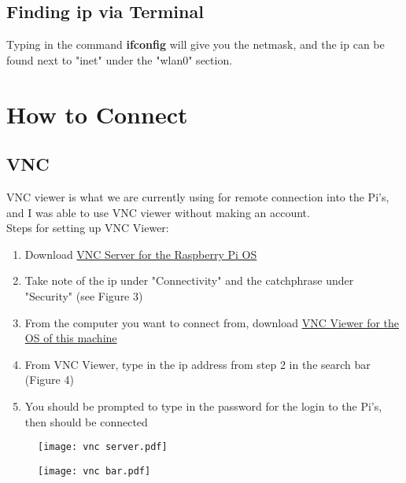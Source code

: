 \documentclass[12pt]{extarticle}
\begin{document}
\subsection{Finding ip via Terminal}
Typing in the command \textbf{ifconfig} will give you the netmask, and the ip can be found next to "inet" under the "wlan0" section.

\newpage
\section{How to Connect}
\subsection{VNC}
VNC viewer is what we are currently using for remote connection into the Pi's, and I was able to use VNC viewer without making an account. \\

Steps for setting up VNC Viewer:
\begin{enumerate}
  \item Download \href{https://www.realvnc.com/en/connect/download/vnc/}{VNC Server for the Raspberry Pi OS}
  \item Take note of the ip under "Connectivity" and the catchphrase under "Security" (see Figure 3)
  \item From the computer you want to connect from, download \href{https://www.realvnc.com/en/connect/download/viewer/}{VNC Viewer for the OS of this machine} 
  \item From VNC Viewer, type in the ip address from step 2 in the search bar (Figure 4)
  \item You should be prompted to type in the password for the login to the Pi's, then should be connected
\end{enumerate}
\begin{figure}[ht]
    \centering
    \texttt{[image: vnc server.pdf]}
    \caption{}
\end{figure}
\newpage
\begin{figure}[ht]
    \centering
    \texttt{[image: vnc bar.pdf]}
    \caption{}
\end{figure}
\end{document}
